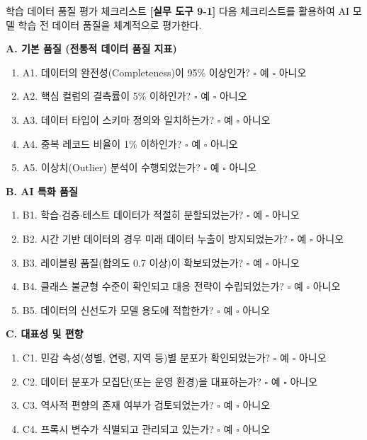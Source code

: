 \begin{practicaltool}{학습 데이터 품질 평가 체크리스트}
\textbf{[실무 도구 9-1]} 다음 체크리스트를 활용하여 AI 모델 학습 전 데이터 품질을 체계적으로 평가한다.

\textbf{A. 기본 품질 (전통적 데이터 품질 지표)}
\begin{enumerate}
 \item A1. 데이터의 완전성(Completeness)이 95\% 이상인가? \hfill $\square$ 예 $\square$ 아니오
 \item A2. 핵심 컬럼의 결측률이 5\% 이하인가? \hfill $\square$ 예 $\square$ 아니오
 \item A3. 데이터 타입이 스키마 정의와 일치하는가? \hfill $\square$ 예 $\square$ 아니오
 \item A4. 중복 레코드 비율이 1\% 이하인가? \hfill $\square$ 예 $\square$ 아니오
 \item A5. 이상치(Outlier) 분석이 수행되었는가? \hfill $\square$ 예 $\square$ 아니오
\end{enumerate}

\textbf{B. AI 특화 품질}
\begin{enumerate}
 \item B1. 학습$\cdot$검증$\cdot$테스트 데이터가 적절히 분할되었는가? \hfill $\square$ 예 $\square$ 아니오
 \item B2. 시간 기반 데이터의 경우 미래 데이터 누출이 방지되었는가? \hfill $\square$ 예 $\square$ 아니오
 \item B3. 레이블링 품질(합의도 0.7 이상)이 확보되었는가? \hfill $\square$ 예 $\square$ 아니오
 \item B4. 클래스 불균형 수준이 확인되고 대응 전략이 수립되었는가? \hfill $\square$ 예 $\square$ 아니오
 \item B5. 데이터의 신선도가 모델 용도에 적합한가? \hfill $\square$ 예 $\square$ 아니오
\end{enumerate}

\textbf{C. 대표성 및 편향}
\begin{enumerate}
 \item C1. 민감 속성(성별, 연령, 지역 등)별 분포가 확인되었는가? \hfill $\square$ 예 $\square$ 아니오
 \item C2. 데이터 분포가 모집단(또는 운영 환경)을 대표하는가? \hfill $\square$ 예 $\square$ 아니오
 \item C3. 역사적 편향의 존재 여부가 검토되었는가? \hfill $\square$ 예 $\square$ 아니오
 \item C4. 프록시 변수가 식별되고 관리되고 있는가? \hfill $\square$ 예 $\square$ 아니오
\end{enumerate}


\end{practicaltool}
